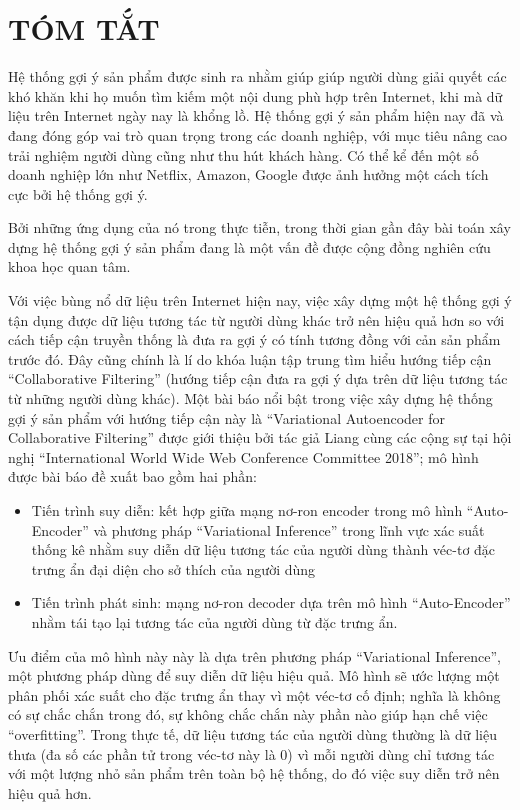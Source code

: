 
\chapter*{TÓM TẮT}
\label{tomtat}

Hệ thống gợi ý sản phẩm được sinh ra nhằm giúp giúp người dùng giải quyết các khó khăn khi họ muốn tìm kiếm một nội dung phù hợp trên Internet, khi mà dữ liệu trên Internet ngày nay là khổng lồ. Hệ thống gợi ý sản phẩm hiện nay đã và đang đóng góp vai trò quan trọng trong các doanh nghiệp, với mục tiêu nâng cao trải nghiệm người dùng cũng như thu hút khách hàng. Có thể kể đến một số doanh nghiệp lớn như Netflix, Amazon, Google được ảnh hưởng một cách tích cực bởi hệ thống gợi ý.

Bởi những ứng dụng của nó trong thực tiễn, trong thời gian gần đây bài toán xây dựng hệ thống gợi ý sản phẩm đang là một vấn đề được cộng đồng nghiên cứu khoa học quan tâm. 

Với việc bùng nổ dữ liệu trên Internet hiện nay, việc xây dựng một hệ thống gợi ý tận dụng được dữ liệu tương tác từ người dùng khác trở nên hiệu quả hơn so với cách tiếp cận truyền thống là đưa ra gợi ý có tính tương đồng với cản sản phẩm trước đó. Đây cũng chính là lí do khóa luận tập trung tìm hiểu hướng tiếp cận ``Collaborative Filtering'' (hướng tiếp cận đưa ra gợi ý dựa trên dữ liệu tương tác từ những người dùng khác). Một bài báo nổi bật trong việc xây dựng hệ thống gợi ý sản phẩm với hướng tiếp cận này là ``Variational Autoencoder for Collaborative Filtering'' \cite{mvae} được giới thiệu bởi tác giả Liang cùng các cộng sự tại hội nghị ``International World Wide Web Conference Committee 2018''; mô hình được bài báo đề xuất bao gồm hai phần:
\begin{itemize}
    \item Tiến trình suy diễn: kết hợp giữa mạng nơ-ron encoder trong mô hình ``Auto-Encoder'' và phương pháp ``Variational Inference'' trong lĩnh vực xác suất thống kê nhằm suy diễn dữ liệu tương tác của người dùng thành véc-tơ đặc trưng ẩn đại diện cho sở thích của người dùng
    \item Tiến trình phát sinh: mạng nơ-ron decoder dựa trên mô hình ``Auto-Encoder'' nhằm tái tạo lại tương tác của người dùng từ đặc trưng ẩn.
\end{itemize}

Ưu điểm của mô hình này này là dựa trên phương pháp ``Variational Inference'', một phương pháp dùng để suy diễn dữ liệu hiệu quả. Mô hình sẽ ước lượng một phân phối xác suất cho đặc trưng ẩn thay vì một véc-tơ cố định; nghĩa là không có sự chắc chắn trong đó, sự không chắc chắn này phần nào giúp hạn chế việc ``overfitting''. Trong thực tế, dữ liệu tương tác của người dùng thường là dữ liệu thưa (đa số các phần tử trong véc-tơ này là 0) vì mỗi người dùng chỉ tương tác với một lượng nhỏ sản phẩm trên toàn bộ hệ thống, do đó việc suy diễn trở nên hiệu quả hơn. 

